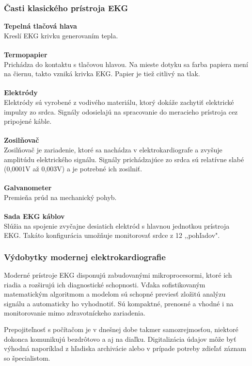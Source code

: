 \documentclass[titlepage]{article}
\begin{document}
\newpage


\subsubsection{Časti klasického prístroja EKG}

\textbf{Tepelná tlačová hlava}
\\
Kreslí EKG krivku generovaním tepla.
\\
\\
\textbf{Termopapier}
\\
Prichádza do kontaktu s tlačovou hlavou. Na mieste dotyku sa farba papiera mení na čiernu, takto vzniká krivka EKG. Papier je tiež citlivý na tlak.
\\
\\
\textbf{Elektródy}
\\
Elektródy sú vyrobené z vodivého materiálu, ktorý dokáže zachytiť elektrické impulzy zo srdca. Signály odosielajú na spracovanie do meracieho prístroja cez pripojené káble.
\\
\\
\textbf{Zosilňovač}
\\
Zosilňovač je zariadenie, ktoré sa nachádza v elektrokardiografe a zvyšuje amplitúdu elektrického signálu. Signály prichádzajúce zo srdca sú relatívne slabé (0,0001V až 0,003V) a je potrebné ich zosilniť.
\\
\\
\textbf{Galvanometer}
\\
Premieňa prúd na mechanický pohyb.
\\
\\
\textbf{Sada EKG káblov}
\\
Slúžia na spojenie zvyčajne desiatich elektród s hlavnou jednotkou prístroja EKG. Takáto konfigurácia umožňuje monitorovať srdce z 12 ,,pohľadov".

\subsubsection{Výdobytky modernej elektrokardiografie}
Moderné prístroje EKG disponujú zabudovanými mikroprocesormi, ktoré ich riadia a rozširujú ich diagnostické schopnosti. Vďaka sofistikovaným matematickým algoritmom a modelom sú schopné previesť zložitú analýzu signálu a automaticky ho vyhodnotiť. Sú kompaktné, prenosné a vhodné i na monitorovanie mimo zdravotníckeho zariadenia.

Prepojiteľnosť s počítačom je v dnešnej dobe takmer samozrejmosťou, niektoré dokonca komunikujú bezdrôtovo a aj na diaľku. Digitalizácia údajov môže byť výhodná naporíklad z hľadiska archivácie alebo v prípade potreby zdieľať záznam so špecialistom.
\end{document}
